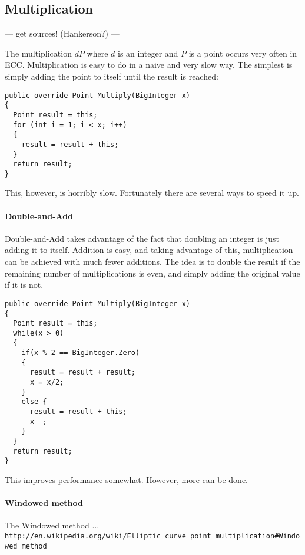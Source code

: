 \subsection{Multiplication}

--- get sources! (Hankerson?) ---

The multiplication \(dP\) where \(d\) is an integer and \(P\) is a point occurs very often in ECC. Multiplication
is easy to do in a naive and very slow way. The simplest is simply adding the point to itself until the result is
reached:

\begin{verbatim}
public override Point Multiply(BigInteger x)
{
  Point result = this;
  for (int i = 1; i < x; i++)
  {
    result = result + this;
  }
  return result;
}
\end{verbatim}

This, however, is horribly slow. Fortunately there are several ways to speed it up.

\paragraph{Double-and-Add}

Double-and-Add takes advantage of the fact that doubling an integer is just adding it to itself. Addition is easy,
and taking advantage of this, multiplication can be achieved with much fewer additions. The idea is to double the
result if the remaining number of multiplications is even, and simply adding the original value if it is not.

\begin{verbatim}
public override Point Multiply(BigInteger x)
{
  Point result = this;
  while(x > 0)
  {
    if(x % 2 == BigInteger.Zero)
    {
      result = result + result;
      x = x/2;
    }
    else {
      result = result + this;
      x--;
    }
  }
  return result;
}
\end{verbatim}

This improves performance somewhat. However, more can be done.

\paragraph{Windowed method}

The Windowed method ... \verb+http://en.wikipedia.org/wiki/Elliptic_curve_point_multiplication#Windowed_method+
